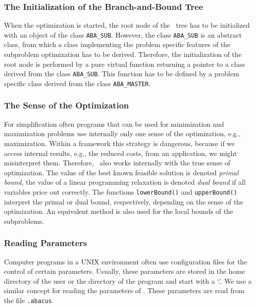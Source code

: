 \subsubsection{The Initialization of the Branch-and-Bound Tree}

When the optimization is started, the root node of the \bab\ tree
has to be initialized with an object of the 
class {\tt ABA\_SUB}. However,
the class {\tt ABA\_SUB} is an abstract class, from which a class implementing
the problem specific features of the subproblem optimization has
to be derived. Therefore, the initialization of the root node is
performed by a pure virtual function returning a pointer to a class derived
from the class {\tt ABA\_SUB}. This function has to be defined by a
problem specific class derived from the class {\tt ABA\_MASTER}.

\subsubsection{The Sense of the Optimization}

For simplification often programs that can be used for minimization and
maximization problems use internally only one sense of the 
optimization, e.g., maximization. Within a framework this strategy
is dangerous, because if we access internal results, e.g., the
reduced costs, from an application, we might misinterpret them.
Therefore, \ABACUS\ also works internally with the true sense of optimization.
The value of the best known feasible solution is denoted
{\it primal bound\/}, the value of a linear
programming relaxation is
denoted {\it dual bound\/} if all variables price out correctly. 
The functions {\tt lowerBound()} and {\tt upperBound()}
interpret the primal or dual bound, respectively,
depending on the sense of the 
optimization. An equivalent method is also used for the local bounds
of the subproblems.

\subsubsection{Reading Parameters}

Computer programs in a UNIX environment often use configuration files
for the control of certain parameters. Usually, these parameters are
stored in the home directory of the user or the directory of the program
and start with a `.'. We use a similar concept for reading the parameters
of \ABACUS. These parameters are read from the file {\tt .abacus}.


